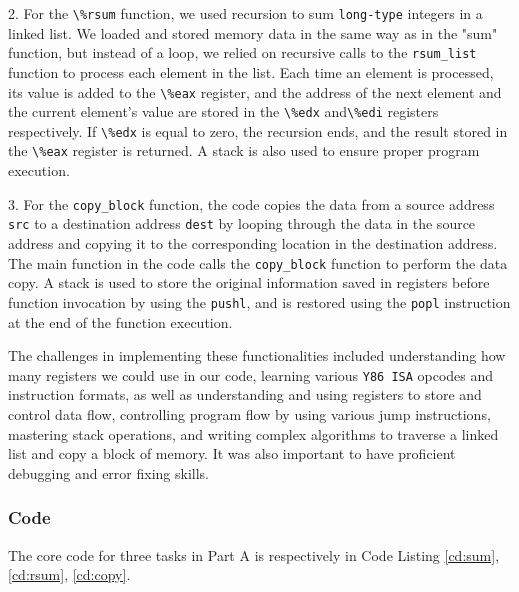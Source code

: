 \documentclass{article}
\begin{document}
2. For the \verb |\%rsum| function, we used recursion to sum \verb |long-type| integers in a linked list. We loaded and stored memory data in the same way as in the "sum" function, but instead of a loop, we relied on recursive calls to the \verb |rsum_list| function to process each element in the list. Each time an element is processed, its value is added to the \verb |\%eax| register, and the address of the next element and the current element's value are stored in the \verb |\%edx| and\verb |\%edi| registers respectively. If \verb |\%edx| is equal to zero, the recursion ends, and the result stored in the \verb |\%eax| register is returned. A stack is also used to ensure proper program execution.

3. For the \verb |copy_block| function, the code copies the data from a source address \verb |src| to a destination address \verb |dest| by looping through the data in the source address and copying it to the corresponding location in the destination address. The main function in the code calls the \verb |copy_block| function to perform the data copy. A stack is used to store the original information saved in registers before function invocation by using the \verb |pushl|, and is restored using the \verb |popl| instruction at the end of the function execution.

The challenges in implementing these functionalities included understanding how many registers we could use in our code, learning various \verb |Y86 ISA| opcodes and instruction formats, as well as understanding and using registers to store and control data flow, controlling program flow by using various jump instructions, mastering stack operations, and writing complex algorithms to traverse a linked list and copy a block of memory. It was also important to have proficient debugging and error fixing skills.

\subsubsection{Code}

The core code for three tasks in Part A is respectively in Code Listing \ref{cd:sum}, \ref{cd:rsum}, \ref{cd:copy}.
\end{document}
